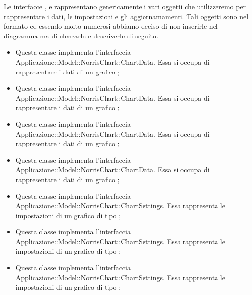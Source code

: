 	Le interfacce ,  \linebreak {} e  rappresentano genericamente i vari oggetti che utilizzeremo per rappresentare i dati, le impostazioni e gli aggiornamamenti. Tali oggetti sono nel formato  ed essendo molto numerosi abbiamo deciso di non inserirle nel diagramma ma di elencarle e descriverle di seguito.

	\begin{itemize}
		\item {} Questa classe implementa l'interfaccia Applicazione::Model::NorrisChart::ChartData. Essa si occupa di rappresentare i dati di un grafico ;

		\item {} Questa classe implementa l'interfaccia Applicazione::Model::NorrisChart::ChartData. Essa si occupa di rappresentare i dati di un grafico ;

		\item {} Questa classe implementa l'interfaccia Applicazione::Model::NorrisChart::ChartData. Essa si occupa di rappresentare i dati di un grafico ;

		\item {} Questa classe implementa l'interfaccia Applicazione::Model::NorrisChart::ChartData. Essa si occupa di rappresentare i dati di un grafico ;

		\item {} Questa classe implementa l'interfaccia Applicazione::Model::NorrisChart::ChartSettings. Essa rappresenta le impostazioni di un grafico di tipo ;

		\item {} Questa classe implementa l'interfaccia Applicazione::Model::NorrisChart::ChartSettings. Essa rappresenta le impostazioni di un grafico di tipo ;

		\item {} Questa classe implementa l'interfaccia Applicazione::Model::NorrisChart::ChartSettings. Essa rappresenta le impostazioni di un grafico di tipo ;


\end{itemize}

